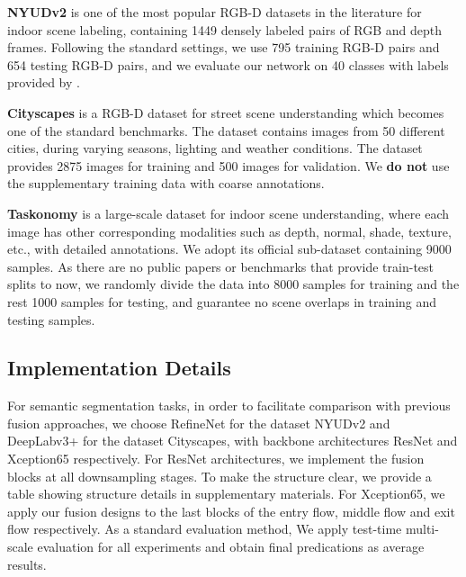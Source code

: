 \documentclass[sigconf]{acmart}
\begin{document}
\textbf{NYUDv2} is one of the most popular RGB-D datasets in the literature for  indoor scene labeling, containing 1449 densely labeled pairs of RGB and depth frames. Following the standard settings, we use 795 training RGB-D pairs and 654 testing RGB-D pairs, and we evaluate our network on 40 classes with labels provided by \cite{DBLP:conf/cvpr/GuptaAM13}.

\textbf{Cityscapes} is a RGB-D dataset for street scene understanding which becomes one of the standard benchmarks. The dataset contains images from 50 different cities, during varying seasons, lighting and weather conditions. The dataset provides 2875 images for training and 500 images for validation. We \textbf{do not} use the supplementary training data with coarse annotations.



\textbf{Taskonomy} is a large-scale dataset for indoor scene understanding, where each image has other corresponding modalities such as depth, normal, shade, texture, etc., with detailed annotations. We adopt its official sub-dataset containing 9000 samples. As there are no public papers or benchmarks that provide train-test splits to now, we randomly divide the data into 8000 samples for training and the rest 1000 samples for testing, and guarantee no scene overlaps in training and testing samples. 



\subsection{Implementation Details}
\label{sec:imple}
For semantic segmentation tasks, in order to facilitate comparison with previous fusion approaches, we choose RefineNet \cite{lin2019refinenet} for the dataset NYUDv2 and DeepLabv3+ \cite{DBLP:conf/eccv/ChenZPSA18} for the dataset Cityscapes, with backbone architectures ResNet \cite{DBLP:conf/cvpr/HeZRS16} and Xception65 \cite{DBLP:conf/cvpr/Chollet17} respectively. For ResNet architectures, we implement the fusion blocks at all downsampling stages. To make the structure clear, we provide a table showing structure details in supplementary materials. For Xception65, we apply our fusion designs to the last blocks of the entry flow, middle flow and exit flow respectively. As a standard evaluation method, We apply test-time multi-scale evaluation for all experiments and obtain final predications as average results. 



\end{document}

